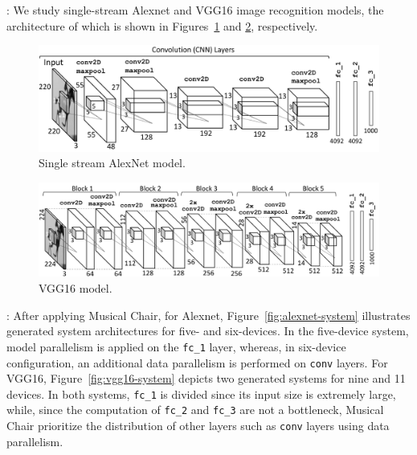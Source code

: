 \documentclass[sigplan]{acmart}
\begin{document}
%
%
%
: We study single-stream Alexnet and VGG16 image recognition models, the architecture of which is shown in Figures~\ref{fig:alexnet} and \ref{fig:vgg16}, respectively.
%
%
\begin{figure}[h]
\centering
\vspace{-5pt}
\includegraphics[width=1.0\linewidth]{figures/alexnet.pdf}
\captionsetup{singlelinecheck=on,aboveskip=3pt, belowskip=0pt}
\caption{Single stream AlexNet model.}
\label{fig:alexnet}
\vspace{-8pt}
\end{figure}
%
%
\begin{figure}[h]
\centering
\vspace{-5pt}
\includegraphics[width=1.0\linewidth]{figures/vgg16.pdf}
\captionsetup{singlelinecheck=on,aboveskip=5pt, belowskip=0pt}
\caption{VGG16 model.}
\label{fig:vgg16}
\vspace{-8pt}
\end{figure}
%
%
%

: After applying Musical Chair, for Alexnet, Figure~\ref{fig:alexnet-system} illustrates generated system architectures for five- and six-devices. In the five-device system, model parallelism is applied on the \texttt{fc\_1} layer, whereas, in six-device configuration, an additional data parallelism is performed on \texttt{conv} layers. For VGG16, Figure~\ref{fig:vgg16-system} depicts two generated systems for nine and 11 devices. In both systems, \texttt{fc\_1} is divided since its input size is extremely large, while, since the computation of \texttt{fc\_2} and \texttt{fc\_3} are not a bottleneck, Musical Chair prioritize the distribution of other layers such as \texttt{conv} layers using data parallelism.
\end{document}
